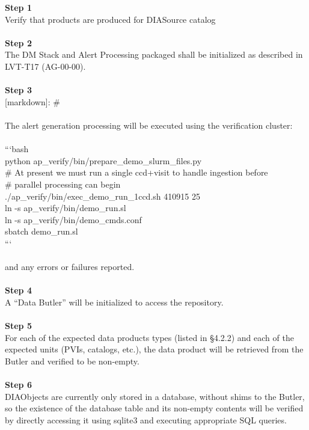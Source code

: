 \textbf{Step 1}\\
Verify that products are produced for DIASource catalog\\
~\\
\textbf{Step 2}\\
The DM Stack and Alert Processing packaged shall be initialized as
described in LVT-T17 (AG-00-00).\\
~\\
\textbf{Step 3}\\
{[}markdown{]}: \#\\
~\\
The alert generation processing will be executed using the verification
cluster:\\
~\\
```bash\\
python ap\_verify/bin/prepare\_demo\_slurm\_files.py\\
\# At present we must run a single ccd+visit to handle ingestion
before\\
\# parallel processing can begin\\
./ap\_verify/bin/exec\_demo\_run\_1ccd.sh 410915 25\\
ln -s ap\_verify/bin/demo\_run.sl\\
ln -s ap\_verify/bin/demo\_cmds.conf\\
sbatch demo\_run.sl\\
```\\
~\\
and any errors or failures reported.\\
~\\
\textbf{Step 4}\\
A ``Data Butler'' will be initialized to access the repository.\\
~\\
\textbf{Step 5}\\
For each of the expected data products types (listed in §4.2.2) and each
of the expected units (PVIs, catalogs, etc.), the data product will be
retrieved from the Butler and verified to be non-empty.\\
~\\
\textbf{Step 6}\\
DIAObjects are currently only stored in a database, without shims to the
Butler, so the existence of the database table and its non-empty
contents will be verified by directly accessing it using sqlite3 and
executing appropriate SQL queries.\\
~\\

